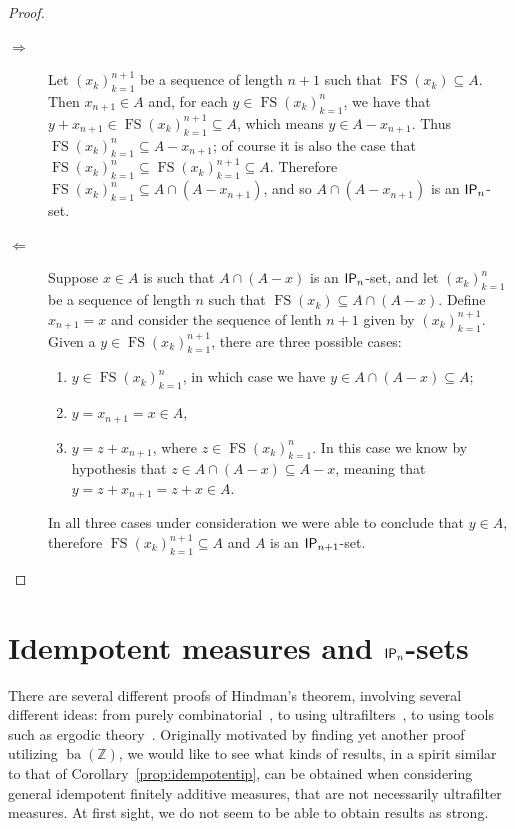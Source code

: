 \documentclass{jloganal}
\theoremstyle{definition}
\DeclareMathOperator{\fs}{FS}
\newcommand{\ba}{\mathop{\mathrm{ba}}}
\newcommand{\ip}{\mathnormal{\mathsf{IP}}}
\begin{document}
\begin{proof}\hfill
\begin{description}
    \item[$\Rightarrow$] Let $(x_k)_{k=1}^{n+1}$ be a sequence of length $n+1$ such that $\fs(x_k)\subseteq A$. Then $x_{n+1}\in A$ and, for each $y\in\fs(x_k)_{k=1}^n$, we have that $y+x_{n+1}\in\fs(x_k)_{k=1}^{n+1}\subseteq A$, which means $y\in A-x_{n+1}$. Thus $\fs(x_k)_{k=1}^n\subseteq A-x_{n+1}$; of course it is also the case that $\fs(x_k)_{k=1}^n\subseteq\fs(x_k)_{k=1}^{n+1}\subseteq A$. Therefore $\fs(x_k)_{k=1}^n\subseteq A\cap(A-x_{n+1})$, and so $A\cap(A-x_{n+1})$ is an $\ip_n$-set.
    \item[$\Leftarrow$] Suppose $x\in A$ is such that $A\cap(A-x)$ is an $\ip_n$-set, and let $(x_k)_{k=1}^n$ be a sequence of length $n$ such that $\fs(x_k)\subseteq A\cap(A-x)$. Define $x_{n+1}=x$ and consider the sequence of lenth $n+1$ given by $(x_k)_{k=1}^{n+1}$. Given a $y\in\fs(x_k)_{k=1}^{n+1}$, there are three possible cases:
    \begin{enumerate}
        \item $y\in\fs(x_k)_{k=1}^n$, in which case we have $y\in A\cap(A-x)\subseteq A$;
        \item $y=x_{n+1}=x\in A$,
        \item $y=z+x_{n+1}$, where $z\in\fs(x_k)_{k=1}^n$. In this case we know by hypothesis that $z\in A\cap(A-x)\subseteq A-x$, meaning that $y=z+x_{n+1}=z+x\in A$.
    \end{enumerate}
    In all three cases under consideration we were able to conclude that $y\in A$, therefore $\fs(x_k)_{k=1}^{n+1}\subseteq A$ and $A$ is an $\ip_{n+1}$-set.
\end{description}
\end{proof}


\section{Idempotent measures and $\ip_n$-sets}
\label{IdempotentandIPset}

There are several different proofs of Hindman's theorem, involving several different ideas: from purely combinatorial~\cite{baumgartner-short-proof-of-hindman}, to using ultrafilters~\cite{Hindman-Strauss,fernandez-monthly}, to using tools such as ergodic theory~\cite{FurstenbergWeiss}. Originally motivated by finding yet another proof utilizing $\ba(\mathbb Z)$, we would like to see what kinds of results, in a spirit similar to that of Corollary~\ref{prop:idempotentip}, can be obtained when considering general idempotent finitely additive measures, that are not necessarily ultrafilter measures. At first sight, we do not seem to be able to obtain results as strong.
\end{document}
